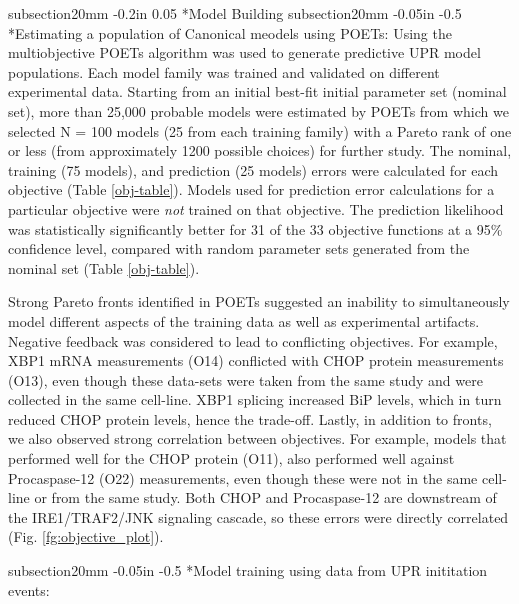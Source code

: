 \documentclass[12pt]{article}
\makeatletter
\renewcommand\subsection{\@startsection
	{subsection}{2}{0mm}
	{-0.05in}
	{-0.5\baselineskip}
	{\normalfont\normalsize\bfseries}}
\renewcommand\section{\@startsection
	{subsection}{2}{0mm}
	{-0.2in}
	{0.05\baselineskip}
	{\normalfont\normalsize\bfseries}}
\makeatother
\begin{document}
\section*{Model Building}
\subsection*{Estimating a population of Canonical meodels using POETs:}
Using the multiobjective POETs algorithm was used to generate predictive UPR model populations.  Each model family was trained and validated on different experimental data. Starting from an initial best-fit initial parameter set (nominal set), more than 25,000 probable models were estimated by POETs from which we selected N = 100 models (25 from each training family) with a Pareto rank of one or less (from approximately 1200 possible choices) for further study. The nominal, training (75 models), and prediction (25 models) errors were calculated for each objective (Table \ref{obj-table}). Models used for prediction error calculations for a particular objective were \emph{not} trained on that objective. The prediction likelihood was statistically significantly better for 31 of the 33 objective functions at a 95\% confidence level, compared with random parameter sets generated from the nominal set (Table \ref{obj-table}). 

Strong Pareto fronts identified in POETs suggested an inability to simultaneously model different aspects of the training data as well as experimental artifacts. Negative feedback was considered to lead to conflicting objectives. For example, XBP1 mRNA measurements (O14) conflicted with CHOP protein measurements (O13), even though these data-sets were taken from the same study and were collected in the same cell-line. XBP1 splicing increased BiP levels, which in turn reduced CHOP protein levels, hence the trade-off. Lastly, in addition to fronts, we also observed strong correlation between objectives. For example, models that performed well for the CHOP protein (O11), also performed well against Procaspase-12 (O22) measurements, even though these were not in the same cell-line or from the same study. Both CHOP and Procaspase-12 are downstream of the IRE1/TRAF2/JNK signaling cascade, so these errors were directly correlated  (Fig. \ref{fg:objective_plot}).

\subsection*{Model training using data from UPR inititation events:} 
\end{document}
